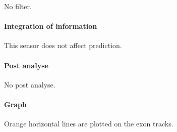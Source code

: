 No filter.

\paragraph{Integration of information}

This sensor does not affect prediction.

\paragraph{Post analyse}

No post analyse.

\paragraph{Graph}

Orange horizontal lines are plotted on the exon tracks.

